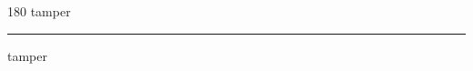 
\begin{frame}
\begin{center}
\begin{turn}{180}
{\fontsize{2.5cm}{1em}\selectfont tamper}
\end{turn}
\vspace{1em}\par  
\hrule
\vspace{1em}\par  
{\fontsize{2.5cm}{1em}\selectfont tamper}
\end{center}
\end{frame}
